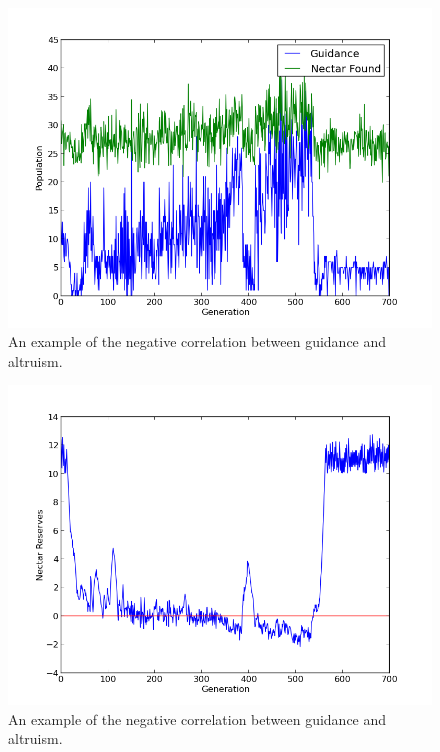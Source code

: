 \documentclass[11pt]{article}
\begin{document}
			\begin{figure}[tb]
				\begin{center}
					\includegraphics[scale=.75]{results/gossip_plot_twist_tell.png}
				\end{center}
                \caption{An example of the negative correlation between guidance and altruism.}
				\label{fig:recurrent_reserves}
			\end{figure}

                        \begin{figure}[tb]
				\begin{center}
					\includegraphics[scale=.75]{results/gossip_plot_twist_res.png}
				\end{center}
				\caption{An example of the negative correlation between guidance and altruism.}
				\label{fig:recurrent_composition}
			\end{figure}
\end{document}
